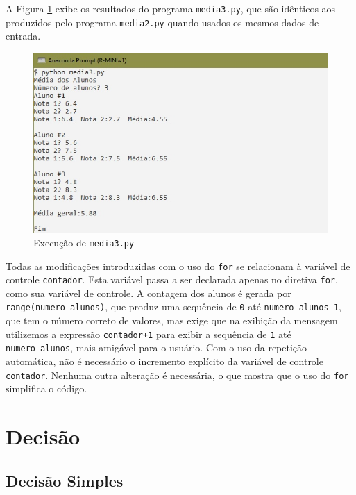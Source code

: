 \documentclass[
]{book}
\begin{document}
A Figura \ref{fig:05-07} exibe os resultados do programa \texttt{media3.py}, que são idênticos aos produzidos pelo programa \texttt{media2.py} quando usados os mesmos dados de entrada.

\begin{figure}
\centering
\includegraphics{images/05-07.jpg}
\caption{\label{fig:05-07}Execução de \texttt{media3.py}}
\end{figure}

Todas as modificações introduzidas com o uso do \texttt{for} se relacionam à variável de controle \texttt{contador}. Esta variável passa a ser declarada apenas no diretiva \texttt{for}, como sua variável de controle. A contagem dos alunos é gerada por \texttt{range(numero\_alunos)}, que produz uma sequência de \texttt{0} até \texttt{numero\_alunos-1}, que tem o número correto de valores, mas exige que na exibição da mensagem utilizemos a expressão \texttt{contador+1} para exibir a sequência de \texttt{1} até \texttt{numero\_alunos}, mais amigável para o usuário. Com o uso da repetição automática, não é necessário o incremento explícito da variável de controle \texttt{contador}. Nenhuma outra alteração é necessária, o que mostra que o uso do \texttt{for} simplifica o código.

\hypertarget{decis}{%
\chapter{Decisão}\label{decis}}

\hypertarget{decis-if}{%
\section{Decisão Simples}\label{decis-if}}
\end{document}
